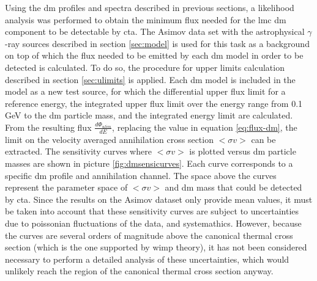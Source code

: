 \documentclass[main.tex]{subfiles}
\begin{document}
Using the \gls{dm} profiles and spectra described in previous sections, a likelihood analysis was performed to obtain the minimum flux needed for the \gls{lmc} \gls{dm} component to be detectable by \gls{cta}. The Asimov data set with the astrophysical $\gamma$-ray sources described in section \ref{sec:model} is used for this task as a background on top of which the flux needed to be emitted by each \gls{dm} model in order to be detected is calculated. To do so, the procedure for upper limits calculation described in section \ref{sec:ulimits} is applied. Each \gls{dm} model is included in the model as a new test source, for which the differential upper flux limit for a reference energy, the integrated upper flux limit over the energy range from 0.1 GeV to the \gls{dm} particle mass, and the integrated energy limit are calculated.\\
From the resulting flux $\frac{d \Phi_{ulim}}{dE}$, replacing the value in equation \ref{eq:flux-dm}, the limit on the velocity averaged annihilation cross section $<\sigma v>$ can be extracted. The sensitivity curves where $<\sigma v>$ is plotted versus \gls{dm} particle masses are shown in picture \ref{fig:dmsensicurves}. Each curve corresponds to a specific \gls{dm} profile and annihilation channel. The space above the curves represent the parameter space of $<\sigma v>$ and \gls{dm} mass that could be detected by \gls{cta}. Since the results on the Asimov dataset only provide mean values, it must be taken into account that these sensitivity curves are subject to uncertainties due to poissonian fluctuations of the data, and systemathics. However, because the curves are several orders of magnitude above the canonical thermal cross section (which is the one supported by \gls{wimp} theory), it has not been considered necessary to perform a detailed analysis of these uncertainties, which would unlikely reach the region of the canonical thermal cross section anyway.
\end{document}
